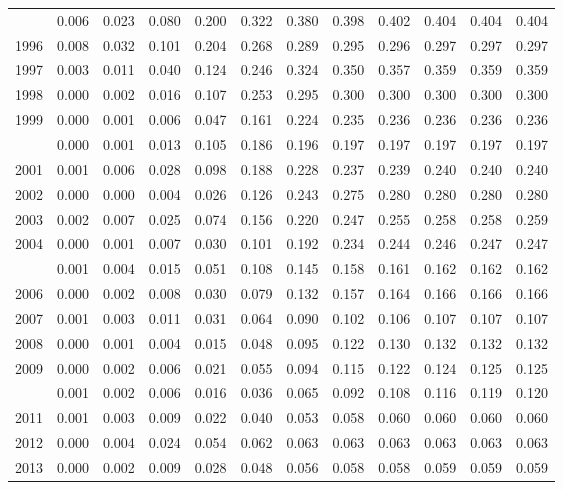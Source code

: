 \documentclass[
]{article}
\begin{document}
\begin{longtable}[t]{lrrrrrrrrrrr}
\addlinespace
1995 & 0.006 & 0.023 & 0.080 & 0.200 & 0.322 & 0.380 & 0.398 & 0.402 & 0.404 & 0.404 & 0.404\\
1996 & 0.008 & 0.032 & 0.101 & 0.204 & 0.268 & 0.289 & 0.295 & 0.296 & 0.297 & 0.297 & 0.297\\
1997 & 0.003 & 0.011 & 0.040 & 0.124 & 0.246 & 0.324 & 0.350 & 0.357 & 0.359 & 0.359 & 0.359\\
1998 & 0.000 & 0.002 & 0.016 & 0.107 & 0.253 & 0.295 & 0.300 & 0.300 & 0.300 & 0.300 & 0.300\\
1999 & 0.000 & 0.001 & 0.006 & 0.047 & 0.161 & 0.224 & 0.235 & 0.236 & 0.236 & 0.236 & 0.236\\
\addlinespace
2000 & 0.000 & 0.001 & 0.013 & 0.105 & 0.186 & 0.196 & 0.197 & 0.197 & 0.197 & 0.197 & 0.197\\
2001 & 0.001 & 0.006 & 0.028 & 0.098 & 0.188 & 0.228 & 0.237 & 0.239 & 0.240 & 0.240 & 0.240\\
2002 & 0.000 & 0.000 & 0.004 & 0.026 & 0.126 & 0.243 & 0.275 & 0.280 & 0.280 & 0.280 & 0.280\\
2003 & 0.002 & 0.007 & 0.025 & 0.074 & 0.156 & 0.220 & 0.247 & 0.255 & 0.258 & 0.258 & 0.259\\
2004 & 0.000 & 0.001 & 0.007 & 0.030 & 0.101 & 0.192 & 0.234 & 0.244 & 0.246 & 0.247 & 0.247\\
\addlinespace
2005 & 0.001 & 0.004 & 0.015 & 0.051 & 0.108 & 0.145 & 0.158 & 0.161 & 0.162 & 0.162 & 0.162\\
2006 & 0.000 & 0.002 & 0.008 & 0.030 & 0.079 & 0.132 & 0.157 & 0.164 & 0.166 & 0.166 & 0.166\\
2007 & 0.001 & 0.003 & 0.011 & 0.031 & 0.064 & 0.090 & 0.102 & 0.106 & 0.107 & 0.107 & 0.107\\
2008 & 0.000 & 0.001 & 0.004 & 0.015 & 0.048 & 0.095 & 0.122 & 0.130 & 0.132 & 0.132 & 0.132\\
2009 & 0.000 & 0.002 & 0.006 & 0.021 & 0.055 & 0.094 & 0.115 & 0.122 & 0.124 & 0.125 & 0.125\\
\addlinespace
2010 & 0.001 & 0.002 & 0.006 & 0.016 & 0.036 & 0.065 & 0.092 & 0.108 & 0.116 & 0.119 & 0.120\\
2011 & 0.001 & 0.003 & 0.009 & 0.022 & 0.040 & 0.053 & 0.058 & 0.060 & 0.060 & 0.060 & 0.060\\
2012 & 0.000 & 0.004 & 0.024 & 0.054 & 0.062 & 0.063 & 0.063 & 0.063 & 0.063 & 0.063 & 0.063\\
2013 & 0.000 & 0.002 & 0.009 & 0.028 & 0.048 & 0.056 & 0.058 & 0.058 & 0.059 & 0.059 & 0.059\\

\end{longtable}
\end{document}
